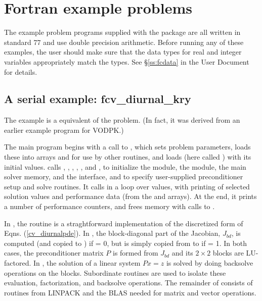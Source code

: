 \section{Fortran example problems}\label{s:ex_fortran}

The {\F} example problem programs supplied with the {\cvode}
package are all written in standard {\F}77 and use double precision
arithmetic.  Before running any of these examples, the user should
make sure that the {\F} data types for real and integer variables
appropriately match the {\CC} types.  See \S\ref{ss:fcdata} in the
{\cvode} User Document for details.

\subsection{A serial example: fcv\_diurnal\_kry}\label{ss:fcv_diurnal}
The  example is a {\F} equivalent of the  problem.
(In fact, it was derived from an earlier {\F} example program for VODPK.)

The main program begins with a call to , which sets problem
parameters, loads these into arrays  and  for use by other
routines, and loads  (here called ) with its initial values.
 calls , , , 
, , and ,
to initialize the {\nvecs} module, the {\sunlinsolspgmr} module, the
main solver memory, and the {\cvls} interface, 
and to specify user-supplied preconditioner setup and solve routines.
It calls  in a loop over  values, with printing of
selected solution values and performance data (from the   and 
arrays).  At the end, it prints a number of performance counters, and
frees memory with calls to .

In , the  routine is a straghtforward implementation
of the discretized form of Eqns. (\ref{cv_diurnalpde}).  In , the
block-diagonal part of the Jacobian, $J_{bd}$, is computed (and copied to
) if  = 0, but is simply copied from  to  if
 = 1.  In both cases, the preconditioner matrix $P$ is formed from 
$J_{bd}$ and its $2 \times 2$ blocks are LU-factored.  In ,
the solution of a linear system $Px = z$ is solved by doing backsolve
operations on the blocks.  Subordinate routines are used to isolate
these evaluation, factorization, and backsolve operations.
The remainder of  consists of
routines from LINPACK and the BLAS needed for matrix and vector operations.

